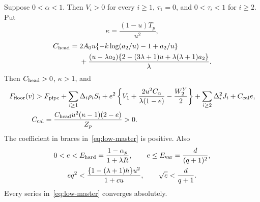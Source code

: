 \begin{lemma}\label{lem:calibrated-head}
Suppose $0<\alpha<1$. Then $V_i>0$ for every
$i\ge1$, $\tau_1=0$, and $0<\tau_i<1$ for $i\ge2$.  Put
\[
 \kappa=\frac{(1-u)T_p}{u^2},
\]
\[\begin{split}
 C_{\rm head}={}&2A_0u\{-k\log(a_2/u)-1+a_2/u\}\\
 &+\frac{(u-\lambda a_2)
       \{2-(3\lambda+1)u+\lambda(\lambda+1)a_2\}}\lambda.
\end{split}\]
Then $C_{\rm head}>0$, $\kappa>1$, and
\begin{align}
 F_{\rm floor}(v)>{}&F_{\rm pipe}
 +\sum_{i\ge1}\Delta_i\rho_i S_i
 +e^2\left\{V_1+\frac{2u^2 C_\alpha}{\lambda(1-e)}
                         -\frac{W_2^Y}{2}\right\}
 +\sum_{i\ge2}\Delta_i^2J_i+C_{\rm cal}e,
 \label{eq:low-master}\\
 C_{\rm cal}&=\frac{C_{\rm head}u^2(\kappa-1)(2-e)}{Z_p}>0.
 \nonumber
\end{align}
The coefficient in braces in~\eqref{eq:low-master} is positive.  Also
\begin{equation}\label{eq:low-e-caps}
 \begin{gathered}
 0<e< E_{\rm hard}=\frac{1-\alpha_p}{1+\lambda R},\qquad
 e\le E_{\rm var}=\frac{d}{(q+1)^2},\\
 e q^2<\frac{\{1-(\lambda+1)h\}u^2}{1+cu},\qquad
 \sqrt e<\frac{d}{q+1}.
 \end{gathered}
\end{equation}
Every series in~\eqref{eq:low-master} converges absolutely.
\end{lemma}
